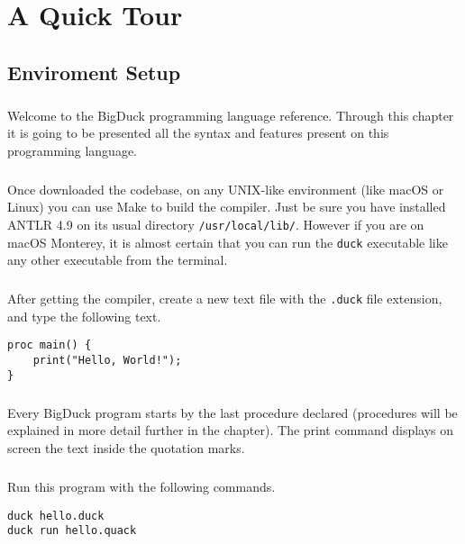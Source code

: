 
\chapter{A Quick Tour}

\section{Enviroment Setup}

\paragraph{} Welcome to the BigDuck programming language reference. Through
this chapter it is going to be presented all the syntax and features present
on this programming language.

\paragraph{} Once downloaded the codebase, on any UNIX-like environment (like
macOS or Linux) you can use Make to build the compiler. Just be sure you have
installed ANTLR 4.9 on its usual directory \texttt{/usr/local/lib/}. However
if you are on macOS Monterey, it is almost certain that you can run the
\texttt{duck} executable like any other executable from the terminal.

\paragraph{} After getting the compiler, create a new text file with the
\texttt{.duck} file extension, and type the following text.
\begin{verbatim}
proc main() {
    print("Hello, World!");
}
\end{verbatim}
\paragraph{} Every BigDuck program starts by the last procedure declared
(procedures will be explained in more detail further in the chapter). The print
command displays on screen the text inside the quotation marks.

\paragraph{} Run this program with the following commands.
\begin{verbatim}
duck hello.duck
duck run hello.quack
\end{verbatim}
